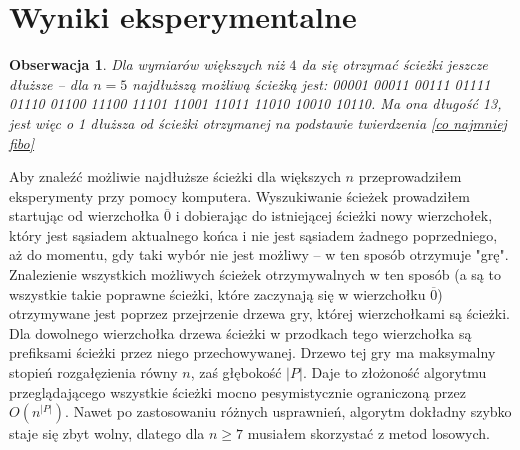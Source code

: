 \documentclass{pracamgr}
\newtheorem{observation}[theorem]{Obserwacja}
\begin{document}
   \section{Wyniki eksperymentalne}
    \begin{observation}\label{da sie dluzsze}
     Dla wymiarów większych niż $4$ da się otrzymać ścieżki jeszcze dłuższe -- dla $n=5$ najdłuższą możliwą ścieżką jest:
     00001
     00011
     00111
     01111
     01110
     01100
     11100
     11101
     11001
     11011
     11010
     10010
     10110.\newline
     Ma ona długość 13, jest więc o 1 dłuższa od ścieżki otrzymanej na podstawie twierdzenia \ref{co najmniej fibo}
    \end{observation}
    Aby znaleźć możliwie najdłuższe ścieżki dla większych $n$ przeprowadziłem eksperymenty przy pomocy komputera.
    Wyszukiwanie ścieżek prowadziłem startując od wierzchołka $\overline{0}$ i dobierając do istniejącej ścieżki nowy wierzchołek,
    który jest sąsiadem aktualnego końca i nie jest sąsiadem żadnego poprzedniego, aż do momentu, gdy taki wybór nie jest możliwy 
    -- w ten sposób otrzymuje "grę". Znalezienie wszystkich możliwych ścieżek otrzymywalnych w ten sposób
    (a są to wszystkie takie poprawne ścieżki, które zaczynają się w wierzchołku $\overline{0}$) otrzymywane jest poprzez przejrzenie
    drzewa gry, której wierzchołkami są ścieżki. Dla dowolnego wierzchołka drzewa ścieżki w przodkach tego wierzchołka są prefiksami ścieżki
    przez niego przechowywanej. Drzewo tej gry ma maksymalny stopień rozgałęzienia równy $n$, zaś głębokość $|P|$.
    Daje to złożoność algorytmu przeglądającego wszystkie ścieżki mocno pesymistycznie ograniczoną przez $O(n^{|P|})$. Nawet po zastosowaniu
    różnych usprawnień, algorytm dokładny szybko staje się zbyt wolny, dlatego dla $n\ge7$ musiałem skorzystać z metod losowych.
    \vspace*{-20pt}
\end{document}
